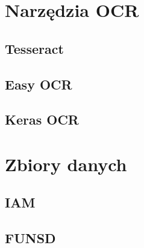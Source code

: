 \label{chapter:related}
 
\section{Narzędzia OCR}\label{chapter:podrozdzial}


\subsection{Tesseract}


\subsection{Easy OCR}


\subsection{Keras OCR}


\section{Zbiory danych}


\subsection{IAM}


\subsection{FUNSD}


